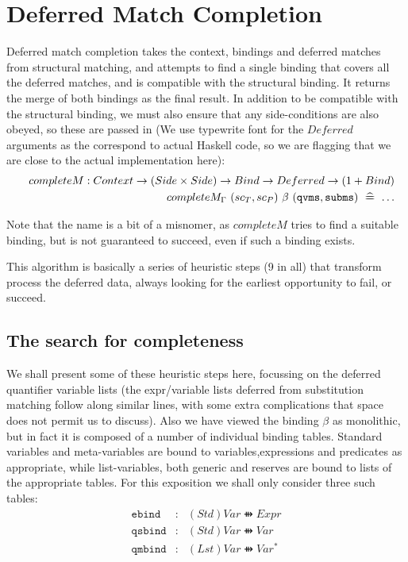 \section{Deferred Match Completion}\label{sec:nondet:matching}

Deferred match completion takes the context,
bindings and deferred matches from structural matching,
and attempts to find a single binding that covers all the deferred
matches, and is compatible with the structural binding.
It returns the merge of both bindings as the final result.
In addition to be compatible with the structural binding,
we must also ensure that any side-conditions are also obeyed,
so these are passed in
(We use typewrite font for the $Deferred$ arguments
as the correspond to actual Haskell code,
so we are flagging that we are close to the actual implementation here):
\begin{eqnarray*}
   && completeM : Context \rightarrow  (Side\times Side) \rightarrow Bind \rightarrow Deferred \rightarrow (1 + Bind)
\\ && completeM_{\Gamma}~(sc_T,sc_P)~\beta~(\texttt{qvms},\texttt{subms}) \mathrel{~\widehat{=\!\!\!\!=}}~ \ldots
\end{eqnarray*}

Note that the name is a bit of a misnomer, as $completeM$ tries
to find a suitable binding, but is not guaranteed to succeed,
even if such a binding exists.

This algorithm is basically a series of heuristic steps
(9 in all)
that transform process the deferred data,
always looking for the earliest opportunity to fail,
or succeed.


\subsection{The search for completeness}


We shall present some of these heuristic steps here,
focussing on the deferred quantifier variable lists
(the expr/variable lists deferred from substitution matching
 follow along similar lines, with some extra complications
 that space does not permit us to discuss).
Also we have viewed the binding $\beta$ as monolithic,
but in fact it is composed of a number of individual binding tables.
Standard variables and meta-variables are bound to variables,expressions
and predicates as appropriate,
while list-variables, both generic and reserves are bound to lists of the
appropriate tables.
For this exposition we shall only consider three such tables:
\begin{eqnarray*}
   \texttt{ebind} &:& (Std)Var \ffun Expr
\\ \texttt{qsbind} &:& (Std)Var \ffun Var
\\ \texttt{qmbind} &:& (Lst)Var \ffun Var^*
\end{eqnarray*}

